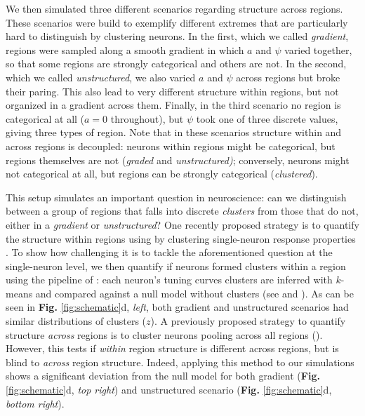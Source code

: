 We then simulated three different scenarios regarding structure across regions. These scenarios were build to exemplify different extremes that are particularly hard to distinguish by clustering neurons.
In the first, which we called \textit{gradient}, regions were sampled along a smooth gradient in which $a$ and $\psi$ varied together, so that some regions are strongly categorical and others are not. In the second, which we called \textit{unstructured}, we also varied $a$ and $\psi$ across regions but broke their paring. This also lead to very different structure within regions, but not organized in a gradient across them. Finally, in the third scenario no region is categorical at all ($a = 0$ throughout), but $\psi$ took one of three discrete values, giving three types of region. Note that in these scenarios structure within and across regions is decoupled: neurons within regions might be categorical, but regions themselves are not (\textit{graded} and \textit{unstructured)}; conversely, neurons might not categorical at all, but regions can be strongly categorical (\textit{clustered}). 

This setup simulates an important question in neuroscience: can we distinguish between a group of regions that falls into discrete \textit{clusters} from those that do not, either in a \textit{gradient} or \textit{unstructured}? One recently proposed strategy is to quantify the structure within regions using by clustering single-neuron response properties \parencite{posani2026}. To show how challenging it is to tackle the aforementioned question at the single-neuron level, we then quantify if neurons formed clusters within a region using the pipeline of \textcite{posani2026}: each neuron's tuning curves clusters are inferred with $k$-means and compared against a null model without clusters (see \textit{} and \textcite{posani2026}). As can be seen in \textbf{Fig.} \ref{fig:schematic}d, \textit{left}, both gradient and unstructured scenarios had similar distributions of clusters ($z$). A previously proposed strategy to quantify structure \textit{across} regions is to cluster neurons pooling across all regions (\textcite{posani2026}). However, this tests if \textit{within} region structure is different across regions, but is blind to \textit{across} region structure. Indeed, applying this method to our simulations shows a significant deviation from the null model for both gradient (\textbf{Fig.} \ref{fig:schematic}d, \textit{top right}) and unstructured scenario (\textbf{Fig.} \ref{fig:schematic}d, \textit{bottom right}).

